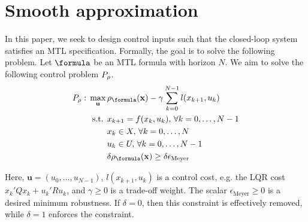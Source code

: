 \section{Smooth approximation}
\label{sec:smooth apx}
\newcommand{\fe}{f_\varepsilon}

In this paper, we seek to design control inputs such that the closed-loop system satisfies an MTL specification.
Formally, the goal is to solve the following problem.
Let $\formula$ be an MTL formula with horizon $N$.
We aim to solve the following control problem $P_\rho$.
\begin{subequations}
	\label{eq:general_ctrl}
	\begin{align}
	P_\rob:\, \max_{\mathbf{u}}\, & \rob_{\formula}(\sstraj) - \gamma \sum_{k=0}^{N-1} l(x_{k+1},u_{k}) \label{eq:general ctrl obj}\\
	\text{s.t. } & x_{k+1} = f(x_k,u_k), \, \forall k=0,\dotsc,N-1 \label{eq:general ctrl dyn}\\
	& x_k \in X, \, \forall k=0,\dotsc,N \label{eq:general ctrl X}\\
	& u_k \in U, \, \forall k=0,\dotsc,N-1 \label{eq:general ctrl U}\\
	& \delta \rob_{\formula}(\sstraj) \geq \delta \epsilon_{\text{Meyer}} \label{eq:general ctrl pos rob}
	\end{align}
\end{subequations}

Here, $\mathbf{u} = (u_0,\ldots,u_{N-1})$, 
$l(x_{k+1},u_{k})$ is a control cost, e.g. the LQR cost $x_k'Qx_k + u_k'Ru_k$,
and $\gamma \geq 0$ is a trade-off weight. 
The scalar $\epsilon_{\text{Meyer}} \geq 0$ is a desired minimum robustness. 
If $\delta = 0$, then this constraint is effectively removed, while $\delta=1$ enforces the constraint.






